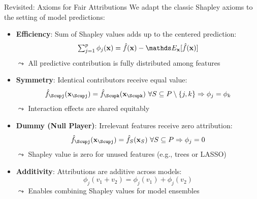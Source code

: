 \documentclass[10pt,compress,t,notes=noshow, xcolor=table]{beamer}
\begin{document}
\begin{frame}{Revisited: Axioms for Fair Attributions}
We adapt the classic Shapley axioms to the setting of model predictions:
\vspace{0.25cm}

\begin{itemize}%
\item \textbf{Efficiency}: Sum of Shapley values adds up to the centered prediction:
\[
\textstyle\sum_{j=1}^p \phi_j(\xv) = \fh(\xv) - \E_\xv[\fh(\xv)]
\]
$\leadsto$ All predictive contribution is fully distributed among features

\item \textbf{Symmetry}: Identical contributors receive equal value:
\[
\fh_{\Scupj}(\xv_{\Scupj}) = \fh_{\Scupk}(\xv_{\Scupk}) \ \forall S \subseteq P \setminus \{j,k\}
\Rightarrow \phi_j = \phi_k
\]
$\leadsto$ Interaction effects are shared equitably

\item \textbf{Dummy (Null Player)}: Irrelevant features receive zero attribution:
\[
\fh_{\Scupj}(\xv_{\Scupj}) = \fh_S(\xv_S) \ \forall S \subseteq P \Rightarrow \phi_j = 0
\]
$\leadsto$ Shapley value is zero for unused features (e.g., trees or LASSO)

\item \textbf{Additivity}: Attributions are additive across models:
\[
\phi_j(v_1 + v_2) = \phi_j(v_1) + \phi_j(v_2)
\]
$\leadsto$ Enables combining Shapley values for model ensembles

\end{itemize}
\end{frame}



\end{document}
